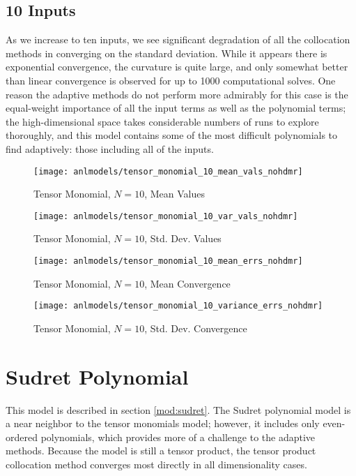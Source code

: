 \subsection{10 Inputs}
As we increase to ten inputs, we see significant degradation of all the collocation methods in converging on
the standard deviation.  While it appears there is exponential convergence, the curvature is quite large, and
only somewhat better than linear convergence is observed for up to 1000 computational solves.  One reason the
adaptive methods do not perform more admirably for this case is the equal-weight importance of all the input
terms as well as the polynomial terms; the high-dimensional space takes considerable numbers of runs to
explore thoroughly, and this model contains some of the most difficult polynomials to find adaptively: those including
all of the inputs. 
\begin{figure}[H]
  \centering
  \texttt{[image: anlmodels/tensor\_monomial\_10\_mean\_vals\_nohdmr]}
  \caption{Tensor Monomial, $N=10$, Mean Values}
  \label{fig:tensormono mean values 10}
\end{figure}
\begin{figure}[H]
  \centering
  \texttt{[image: anlmodels/tensor\_monomial\_10\_var\_vals\_nohdmr]}
  \caption{Tensor Monomial, $N=10$, Std. Dev. Values}
  \label{fig:tensormono var values 10}
\end{figure}

\begin{figure}[H]
  \centering
  \texttt{[image: anlmodels/tensor\_monomial\_10\_mean\_errs\_nohdmr]}
  \caption{Tensor Monomial, $N=10$, Mean Convergence}
  \label{fig:tensormono mean errors 10}
\end{figure}
\begin{figure}[H]
  \centering
  \texttt{[image: anlmodels/tensor\_monomial\_10\_variance\_errs\_nohdmr]}
  \caption{Tensor Monomial, $N=10$, Std. Dev. Convergence}
  \label{fig:tensormono var errors 10}
\end{figure}


\section{Sudret Polynomial}
This model is described in section \ref{mod:sudret}.  The Sudret polynomial model is a near neighbor to the
tensor monomials model; however, it includes only even-ordered polynomials, which provides more of a challenge
to the adaptive methods.  Because the model is still a tensor product, the tensor product collocation method 
converges most directly in all dimensionality cases.

